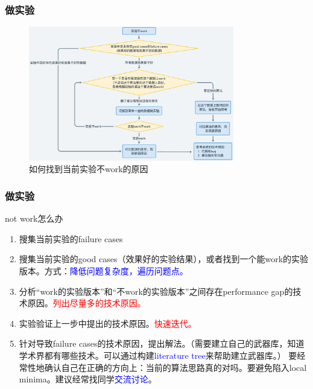 \documentclass{beamer}
\begin{document}
\begin{frame}
    \frametitle{做实验}
    \begin{figure}[h]
        \centering
        \includegraphics[width=0.8\textwidth]{figure/idea_not_work.png}
        \caption{如何找到当前实验不work的原因}
        \label{fig:experiment}
    \end{figure}
\end{frame}


\begin{frame}
    \frametitle{做实验}
    \begin{block}{not work怎么办}
        \begin{enumerate}
            \item 搜集当前实验的failure cases
            \item 搜集当前实验的good cases（效果好的实验结果），或者找到一个能work的实验版本。方式：\textcolor{blue}{降低问题复杂度，遍历问题点。}
            \item 分析“work的实验版本”和“不work的实验版本”之间存在performance gap的技术原因。\textcolor{red}{列出尽量多的技术原因。}
            \item 实验验证上一步中提出的技术原因。\textcolor{red}{快速迭代。}
            \item 针对导致failure cases的技术原因，提出解法。（需要建立自己的武器库，知道学术界都有哪些技术。可以通过构建\textcolor{blue}{literature tree}来帮助建立武器库。）
            要经常性地确认自己在正确的方向上：当前的算法思路真的对吗。要避免陷入local minima。建议经常找同学\textcolor{blue}{交流讨论}。
        \end{enumerate}
    \end{block}
\end{frame}
\end{document}
